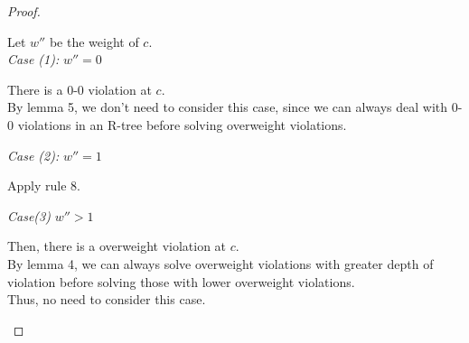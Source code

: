 \documentclass[10pt]{article}
\begin{document}
\begin{enumerate}
\begin{proof}
\begin{addmargin}[1em]{0em}
\begin{addmargin}[1em]{0em}
			Let $w''$ be the weight of $c$. \\
			\textit{Case (1):} $w'' = 0$
			\begin{addmargin}[1em]{0em}
				There is a 0-0 violation at $c$. \\
				By lemma 5, we don't need to consider this case, since we can always deal with 0-0 violations in an R-tree before solving overweight violations.
			\end{addmargin}
			\textit{Case (2):} $w'' = 1$
			\begin{addmargin}[1em]{0em}
				Apply rule 8.
			\end{addmargin}
			\textit{Case(3)} $w'' > 1$
			\begin{addmargin}[1em]{0em}
				Then, there is a overweight violation at $c$. \\
				By lemma 4, we can always solve overweight violations with greater depth of violation before solving those with lower overweight violations. \\
				Thus, no need to consider this case.
			\end{addmargin}
		\end{addmargin}
	\end{addmargin}
	\end{proof}


\end{enumerate}
\end{document}
